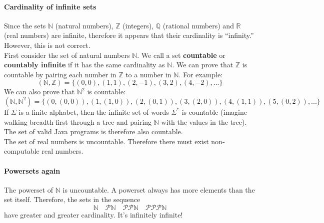 \documentclass{article}
\begin{document}
\paragraph{Cardinality of infinite sets} Since the sets $\mathbb{N}$ (natural numbers), $\mathbb{Z}$ (integers), $\mathbb{Q}$ (rational numbers) and $\mathbb{R}$ (real numbers) are infinite, therefore it appears that their cardinality is ``infinity.'' However, this is not correct.
\vspace{1mm}\\
First consider the set of natural numbers $\mathbb{N}$. We call a set \textbf{countable} or \textbf{countably infinite} if it has the same cardinality as $\mathbb{N}$. We can prove that $\mathbb{Z}$ is countable by pairing each number in $\mathbb{Z}$ to a number in $\mathbb{N}$. For example:
$$(\mathbb{N,Z})=\{(0,0),(1,1),(2,-1),(3,2),(4,-2),...\}$$
We can also prove that $\mathbb{N}^2$ is countable:
$$(\mathbb{N,N}^2)=\{(0,(0,0)),(1,(1,0)),(2,(0,1)),(3,(2,0)),(4,(1,1)),(5,(0,2)),...\}$$
If $\Sigma$ is a finite alphabet, then the infinite set of words $\Sigma^*$ is countable (imagine walking breadth-first through a tree and pairing $\mathbb{N}$ with the values in the tree). The set of valid Java programs is therefore also countable.
\vspace{1mm}\\
The set of real numbers is uncountable. Therefore there must exist non-computable real numbers.

\paragraph{Powersets again} The powerset of $\mathbb{N}$ is uncountable. A powerset always has more elements than the set itself. Therefore, the sets in the sequence
$$\mathbb{N}\quad \mathscr{P}\mathbb{N}\quad \mathscr{PP}\mathbb{N}\quad \mathscr{PPP}\mathbb{N}$$
have greater and greater cardinality. It's infinitely infinite!
\end{document}
